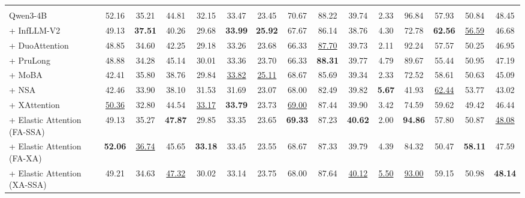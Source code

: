 \begin{table}[t]
{\begin{tabular}{l|ccccccccccccc|c}
\rowcolor{blue!10}
\multicolumn{15}{c}{\textbf{Qwen3-4B 骨干模型}} \\
\arrayrulecolor{black!20}\midrule
Qwen3-4B & 52.16 & 35.21 & 44.81 & 32.15 & 33.47 & 23.45 & 70.67 & 88.22 & 39.74 & 2.33 & 96.84 & 57.93 & 50.84 & 48.45 \\
+ InfLLM-V2 & 49.13 & \textbf{37.51} & 40.26 & 29.68 & \textbf{33.99} & \textbf{25.92} & 67.67 & 86.14 & 38.76 & 4.30 & 72.78 & \textbf{62.56} & \underline{56.59} & 46.68 \\
+ DuoAttention & 48.85 & 34.60 & 42.25 & 29.18 & 33.26 & 23.68 & 66.33 & \underline{87.70} & 39.73 & 2.11 & 92.24 & 57.57 & 50.25 & 46.95 \\
+ PruLong & 48.88 & 34.28 & 45.14 & 30.01 & 33.36 & 23.70 & 66.33 & \textbf{88.31} & 39.77 & 4.79 & 89.67 & 55.44 & 50.95 & 47.19 \\
+ MoBA & 42.41 & 35.80 & 38.76 & 29.84 & \underline{33.82} & \underline{25.11} & 68.67 & 85.69 & 39.34 & 2.33 & 72.52 & 58.61 & 50.63 & 45.09 \\
+ NSA & 42.46 & 33.90 & 38.10 & 31.53 & 31.69 & 23.07 & 68.00 & 82.49 & 39.82 & \textbf{5.67} & 41.93 & \underline{62.44} & 53.77 & 43.02 \\
+ XAttention & \underline{50.36} & 32.80 & 44.54 & \underline{33.17} & \textbf{33.79} & 23.73 & \underline{69.00} & 87.44 & 39.90 & 3.42 & 74.59 & 59.62 & 49.42 & 46.44 \\
\arrayrulecolor{black!40}\midrule
+ Elastic Attention (FA-SSA) & 49.13 & 35.27 & \textbf{47.87} & 29.85 & 33.35 & 23.65 & \textbf{69.33} & 87.23 & \textbf{40.62} & 2.00 & \textbf{94.86} & 57.80 & 50.87 & \underline{48.08} \\
+ Elastic Attention (FA-XA) & \textbf{52.06} & \underline{36.74} & 45.65 & \textbf{33.18} & 33.45 & 23.55 & 68.67 & 87.33 & 39.79 & 4.39 & 84.32 & 50.47 & \textbf{58.11} & 47.59 \\
+ Elastic Attention (XA-SSA) & 49.21 & 34.63 & \underline{47.32} & 30.02 & 33.14 & 23.75 & 68.00 & 87.64 & \underline{40.12} & \underline{5.50} & \underline{93.00} & 59.15 & 50.98 & \textbf{48.14} \\


\end{tabular}}
\end{table}

